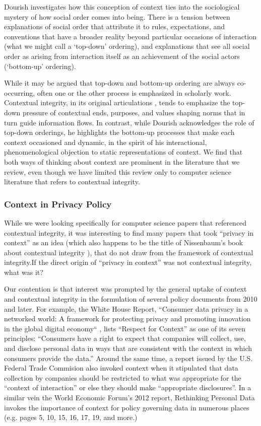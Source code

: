 \documentclass[../thesis.tex]{subfiles}
\begin{document}
Dourish investigates how this conception of context ties into the
sociological mystery of how social order comes into being. There is a
tension between explanations of social order that attribute it to
rules, expectations, and conventions that have a broader reality beyond
particular occasions of interaction (what we might call a
`top-down' ordering), and explanations
that see all social order as arising from interaction itself as an
achievement of the social actors
(`bottom-up' ordering).

While it may be argued that top-down and bottom-up ordering
are always
co-occurring, often one or the other process is emphasized
in scholarly
work. Contextual integrity, in its original articulations
\citep{nissenbaum2004privacy, nissenbaum2009privacy},
tends to emphasize the top-down
pressure of
contextual ends, purposes, and values shaping norms that in turn guide
information flows. In contrast, while Dourish acknowledges the role of
top-down orderings, he highlights the bottom-up processes that make
each context occasioned and dynamic, in the spirit of his
interactional, phenomenological objection to static representations of
context. We find that both ways of thinking about context are prominent
in the literature that we review, even though we have limited this
review only to computer science literature that refers to contextual
integrity. 

\subsubsection{Context in Privacy Policy}
\label{CI2.2.2}
  
While we were looking specifically for computer science papers that
referenced contextual integrity, it was interesting to find many papers
that took ``privacy in context'' as
an idea (which also happens to be the title of
Nissenbaum's book about contextual integrity
\citep{nissenbaum2009privacy}), that do not draw from the framework of contextual
integrity.If the direct origin of ``privacy in
context'' was not contextual integrity, what was it?

Our contention is that interest was prompted by the general uptake of
context and contextual integrity in the formulation of several policy
documents from 2010 and later. For example, the White House Report,
``Consumer data privacy in a networked world: A
framework for protecting privacy and promoting innovation in the global
digital economy`` \citep{house2012consumer}, lists
``Respect for Context'' as one of
its seven principles: ``Consumers have a right to
expect that companies will collect, use, and disclose personal data in
ways that are consistent with the context in which consumers provide
the data.'' Around the same time, a report issued by
the U.S. Federal Trade Commision also invoked context when it
stipulated that data collection by companies should be restricted to
what was appropriate for the ``context of
interaction'' or else they should make
``appropriate disclosures''. In a
similar vein the World Economic Forum's 2012 report,
Rethinking Personal Data invokes the importance of context for policy
governing data in numerous places (e.g. pages 5, 10, 15, 16, 17, 19,
and more.) \citep{wef2012rethinking} 
\end{document}
